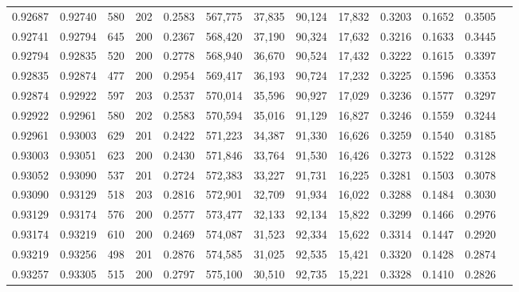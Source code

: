\begin{tabular}{rrrrrrrrrrrrr}
0.92687 & 0.92740 &   580 & 202 &                                     0.2583 & 567,775 &  37,835 &  90,124 &  17,832 & 0.3203 & 0.1652 & 0.3505 \\
0.92741 & 0.92794 &   645 & 200 &                                     0.2367 & 568,420 &  37,190 &  90,324 &  17,632 & 0.3216 & 0.1633 & 0.3445 \\
0.92794 & 0.92835 &   520 & 200 &                                     0.2778 & 568,940 &  36,670 &  90,524 &  17,432 & 0.3222 & 0.1615 & 0.3397 \\
0.92835 & 0.92874 &   477 & 200 &                                     0.2954 & 569,417 &  36,193 &  90,724 &  17,232 & 0.3225 & 0.1596 & 0.3353 \\
0.92874 & 0.92922 &   597 & 203 &                                     0.2537 & 570,014 &  35,596 &  90,927 &  17,029 & 0.3236 & 0.1577 & 0.3297 \\
0.92922 & 0.92961 &   580 & 202 &                                     0.2583 & 570,594 &  35,016 &  91,129 &  16,827 & 0.3246 & 0.1559 & 0.3244 \\
0.92961 & 0.93003 &   629 & 201 &                                     0.2422 & 571,223 &  34,387 &  91,330 &  16,626 & 0.3259 & 0.1540 & 0.3185 \\
0.93003 & 0.93051 &   623 & 200 &                                     0.2430 & 571,846 &  33,764 &  91,530 &  16,426 & 0.3273 & 0.1522 & 0.3128 \\
0.93052 & 0.93090 &   537 & 201 &                                     0.2724 & 572,383 &  33,227 &  91,731 &  16,225 & 0.3281 & 0.1503 & 0.3078 \\
0.93090 & 0.93129 &   518 & 203 &                                     0.2816 & 572,901 &  32,709 &  91,934 &  16,022 & 0.3288 & 0.1484 & 0.3030 \\
0.93129 & 0.93174 &   576 & 200 &                                     0.2577 & 573,477 &  32,133 &  92,134 &  15,822 & 0.3299 & 0.1466 & 0.2976 \\
0.93174 & 0.93219 &   610 & 200 &                                     0.2469 & 574,087 &  31,523 &  92,334 &  15,622 & 0.3314 & 0.1447 & 0.2920 \\
0.93219 & 0.93256 &   498 & 201 &                                     0.2876 & 574,585 &  31,025 &  92,535 &  15,421 & 0.3320 & 0.1428 & 0.2874 \\
0.93257 & 0.93305 &   515 & 200 &                                     0.2797 & 575,100 &  30,510 &  92,735 &  15,221 & 0.3328 & 0.1410 & 0.2826 \\

\end{tabular}
